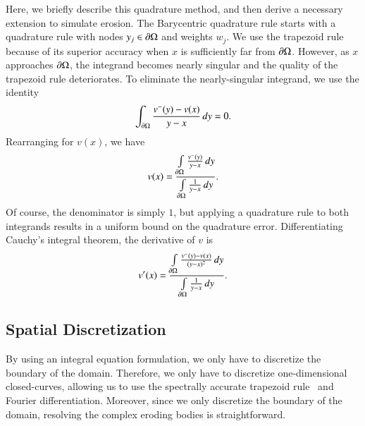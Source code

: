 \documentclass[preprint, 10pt]{elsarticle}
\begin{document}
Here, we briefly describe this quadrature method, and then derive a
necessary extension to simulate erosion.  The Barycentric quadrature
rule starts with a quadrature rule with nodes $y_j \in {\partial}\Omega$ and
weights $w_j$. We use the trapezoid rule because of its superior
accuracy when $x$ is sufficiently far from ${\partial}\Omega$.  However, as $x$
approaches ${\partial}\Omega$, the integrand becomes nearly singular and the
quality of the trapezoid rule deteriorates. To eliminate the
nearly-singular integrand, we use the identity
\begin{align}
  \int_{{\partial}\Omega} \frac{v^{-}(y) - v(x)}{y - x} \,dy = 0.
\end{align}
Rearranging for $v(x)$, we have
\begin{align}
  v(x) = \frac{\int\limits_{{\partial}\Omega} \frac{v^{-}(y)}{y-x}\, dy}
    {\int\limits_{{\partial}\Omega} \frac{1}{y-x}\, dy}.
\end{align}
Of course, the denominator is simply $1$, but applying a quadrature rule
to both integrands results in a uniform bound on the quadrature error.
Differentiating Cauchy's integral theorem, the derivative of $v$ is
\begin{align}
  v'(x) = \frac{\int\limits_{{\partial}\Omega} \frac{v^{-}(y) - v(x)}{(y-x)^2}\, dy}
    {\int\limits_{{\partial}\Omega} \frac{1}{y-x}\, dy}.
\end{align}

\subsection{Spatial Discretization}
\label{s:spatialDiscretization}
By using an integral equation formulation, we only have to discretize
the boundary of the domain.  Therefore, we only have to discretize
one-dimensional closed-curves, allowing us to use the spectrally
accurate trapezoid rule~\cite{tre-wei2014} and Fourier differentiation.
Moreover, since we only discretize the boundary of the domain, resolving
the complex eroding bodies is straightforward.
\end{document}
